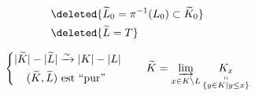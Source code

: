 
\[
\begin{aligned}
&\deleted{\widetilde L_0=\pi^{-1}(L_0)\subset\widetilde K_0}\\
&\deleted{\widetilde L=T}
\end{aligned}
\]

\[
\left\{\begin{aligned}
|\widetilde K|-|\widetilde L|&\xrightarrow{\sim}|K|-|L|\\
(\widetilde K,\widetilde L)&\text{ est ``pur''}
\end{aligned}\right.
\qquad
\widetilde K=\varinjlim_{x\in K\backslash L}
\underset{\substack{\shortparallel\\ \{y\in K\mid y\leq x\}}}{K_x}
\]

